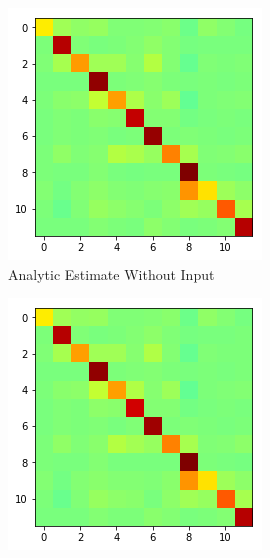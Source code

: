 \documentclass[a4paper,10pt]{article}
\begin{document}
\begin{figure}
    \centering
    \begin{subfigure}[b]{0.4\textwidth}
        \includegraphics[width=\textwidth]{img/marN_analytic_noinput_A1.png}
        \caption{Analytic Estimate Without Input}
        \label{fig:marN_analytic_noinput_A1}
    \end{subfigure}\hspace{0.05\textwidth}
    \begin{subfigure}[b]{0.4\textwidth}
        \includegraphics[width=\textwidth]{img/marN_analytic_withinput_A1.png}

\end{subfigure}
\end{figure}
\end{document}
